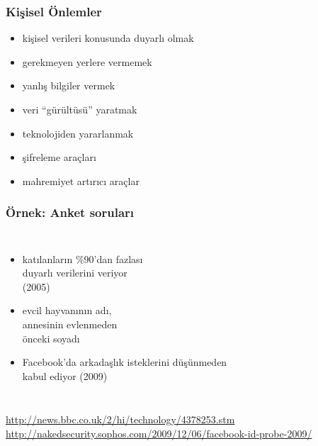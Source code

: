 \documentclass[dvipsnames]{beamer}
\theoremstyle{plain}
\begin{document}
\begin{frame}
  \frametitle{Kişisel Önlemler}

  \begin{itemize}
    \item kişisel verileri konusunda duyarlı olmak
    \item gerekmeyen yerlere vermemek
    \item yanlış bilgiler vermek
    \item veri ``gürültüsü'' yaratmak

    \pause
    \bigskip
    \item teknolojiden yararlanmak
    \item şifreleme araçları
    \item mahremiyet artırıcı araçlar
  \end{itemize}
\end{frame}

\begin{frame}
  \frametitle{Örnek: Anket soruları}

  \begin{columns}

    \begin{itemize}
      \item katılanların \%90'dan fazlası\\
        duyarlı verilerini veriyor\\
        (2005)
      \item evcil hayvanının adı,\\
        annesinin evlenmeden\\
        önceki soyadı

      \bigskip
      \item Facebook'da arkadaşlık isteklerini düşünmeden\\
        kabul ediyor (2009)
    \end{itemize}
  \end{columns}

  \medskip
  \tiny{\url{http://news.bbc.co.uk/2/hi/technology/4378253.stm}}\\
  \tiny{\url{http://nakedsecurity.sophos.com/2009/12/06/facebook-id-probe-2009/}}\\
\end{frame}
\end{document}

